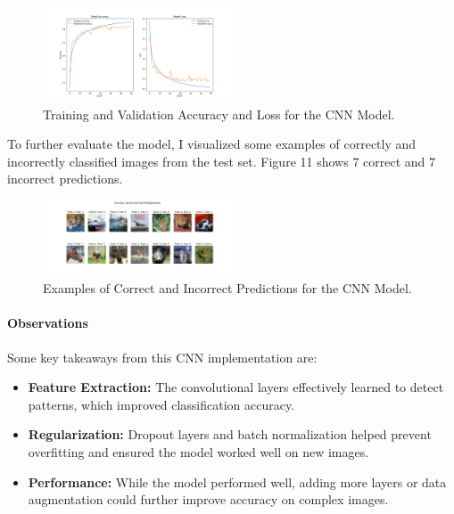 \documentclass[lettersize,journal]{IEEEtran}
\begin{document}
\begin{figure}[h!]
    \centering
    \includegraphics[width=0.5\textwidth]{training_history_CNN.png}
    \caption{Training and Validation Accuracy and Loss for the CNN Model.}
    \label{fig:cnn_training_history}
\end{figure}

To further evaluate the model, I visualized some examples of correctly and incorrectly classified images from the test set. Figure 11 shows 7 correct and 7 incorrect predictions.

\begin{figure}[h!]
    \centering
    \includegraphics[width=0.5\textwidth]{sample_predictions_CNN.png}
    \caption{Examples of Correct and Incorrect Predictions for the CNN Model.}
    \label{fig:cnn_sample_predictions}
\end{figure}

\paragraph{\textbf{Observations}}

Some key takeaways from this CNN implementation are:
\begin{itemize}
    \item \textbf{Feature Extraction:} The convolutional layers effectively learned to detect patterns, which improved classification accuracy.
    \item \textbf{Regularization:} Dropout layers and batch normalization helped prevent overfitting and ensured the model worked well on new images.
    \item \textbf{Performance:} While the model performed well, adding more layers or data augmentation could further improve accuracy on complex images.
\end{itemize}
\end{document}
